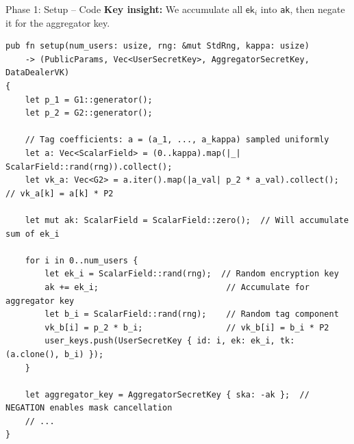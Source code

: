 \documentclass[aspectratio=169,10pt]{beamer}
\begin{document}
\begin{frame}[fragile]{Phase 1: Setup -- Code}
    \textbf{Key insight:} We accumulate all $\mathsf{ek}_i$ into \texttt{ak}, then negate it for the aggregator key.

    \vspace{0.3em}
\begin{lstlisting}[style=rust]
pub fn setup(num_users: usize, rng: &mut StdRng, kappa: usize)
    -> (PublicParams, Vec<UserSecretKey>, AggregatorSecretKey, DataDealerVK)
{
    let p_1 = G1::generator();
    let p_2 = G2::generator();

    // Tag coefficients: a = (a_1, ..., a_kappa) sampled uniformly
    let a: Vec<ScalarField> = (0..kappa).map(|_| ScalarField::rand(rng)).collect();
    let vk_a: Vec<G2> = a.iter().map(|a_val| p_2 * a_val).collect();  // vk_a[k] = a[k] * P2

    let mut ak: ScalarField = ScalarField::zero();  // Will accumulate sum of ek_i

    for i in 0..num_users {
        let ek_i = ScalarField::rand(rng);  // Random encryption key
        ak += ek_i;                          // Accumulate for aggregator key
        let b_i = ScalarField::rand(rng);    // Random tag component
        vk_b[i] = p_2 * b_i;                 // vk_b[i] = b_i * P2
        user_keys.push(UserSecretKey { id: i, ek: ek_i, tk: (a.clone(), b_i) });
    }

    let aggregator_key = AggregatorSecretKey { ska: -ak };  // NEGATION enables mask cancellation
    // ...
}
\end{lstlisting}
\end{frame}
\end{document}
